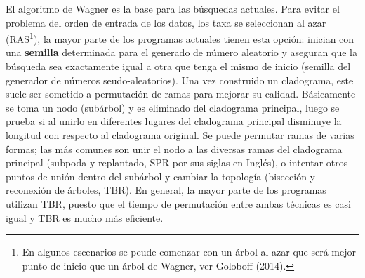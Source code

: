 El algoritmo de Wagner es la base para las b\'usquedas actuales. Para evitar el problema del orden de entrada de los datos,   los taxa se  seleccionan al azar (RAS\footnote{En algunos escenarios se peude comenzar con un \'arbol al azar que ser\'a mejor punto de inicio que un \'arbol de Wagner, ver Goloboff (2014).}),
la mayor parte de los programas actuales tienen esta opci\'on: inician con una \textbf{semilla} determinada para el generado de n\'umero aleatorio y aseguran que la b\'usqueda sea exactamente igual a otra que tenga el mismo de inicio (semilla del generador de n\'umeros seudo-aleatorios). Una vez construido un cladograma,  este suele ser sometido a permutaci\'on de ramas para mejorar su calidad. B\'asicamente se toma un nodo (sub\'arbol) y es eliminado del cladograma principal,   luego se prueba si al unirlo en diferentes lugares del cladograma principal disminuye la longitud con respecto al cladograma original. Se puede permutar ramas de varias formas;  las m\'as comunes son unir el nodo a las diversas ramas del cladograma principal (subpoda y replantado,  SPR por sus siglas en Ingl\'es),  o intentar otros puntos de uni\'on dentro del sub\'arbol y cambiar la topolog\'ia (bisecci\'on y reconexi\'on de \'arboles,  TBR). En general,   la mayor parte de los programas utilizan TBR,  puesto que el tiempo de permutaci\'on entre ambas t\'ecnicas es casi igual y TBR es mucho m\'as eficiente.


